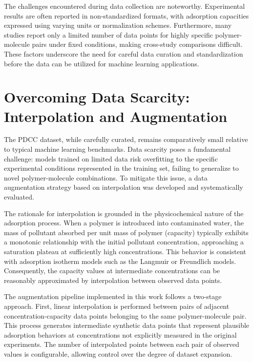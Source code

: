 The challenges encountered during data collection are noteworthy. Experimental results are often reported in non-standardized formats, with adsorption capacities expressed using varying units or normalization schemes. Furthermore, many studies report only a limited number of data points for highly specific polymer-molecule pairs under fixed conditions, making cross-study comparisons difficult. These factors underscore the need for careful data curation and standardization before the data can be utilized for machine learning applications.

\section{Overcoming Data Scarcity: Interpolation and Augmentation}
\label{sec:data_augmentation}

The PDCC dataset, while carefully curated, remains comparatively small relative to typical machine learning benchmarks. Data scarcity poses a fundamental challenge: models trained on limited data risk overfitting to the specific experimental conditions represented in the training set, failing to generalize to novel polymer-molecule combinations. To mitigate this issue, a data augmentation strategy based on interpolation was developed and systematically evaluated.

The rationale for interpolation is grounded in the physicochemical nature of the adsorption process. When a polymer is introduced into contaminated water, the mass of pollutant absorbed per unit mass of polymer (capacity) typically exhibits a monotonic relationship with the initial pollutant concentration, approaching a saturation plateau at sufficiently high concentrations. This behavior is consistent with adsorption isotherm models such as the Langmuir or Freundlich models. Consequently, the capacity values at intermediate concentrations can be reasonably approximated by interpolation between observed data points.

The augmentation pipeline implemented in this work follows a two-stage approach. First, linear interpolation is performed between pairs of adjacent concentration-capacity data points belonging to the same polymer-molecule pair. This process generates intermediate synthetic data points that represent plausible adsorption behaviors at concentrations not explicitly measured in the original experiments. The number of interpolated points between each pair of observed values is configurable, allowing control over the degree of dataset expansion.

